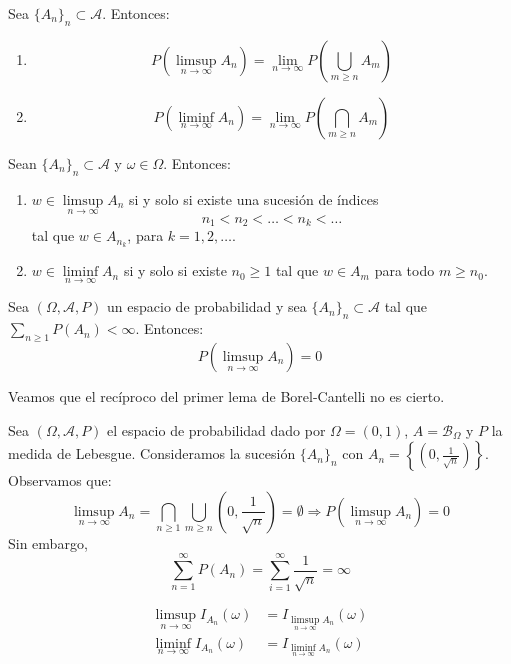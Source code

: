 \begin{theorem}
    Sea $\{A_n\}_n \subset \mathcal{A}$.
    Entonces:
    \begin{enumerate}
        \item $$P(\limsup\limits_{n \to \infty} A_n) = \lim\limits_{n \to \infty} P(\bigcup_{m \geq n} A_m)$$
        \item $$P(\liminf\limits_{n \to \infty} A_n) = \lim\limits_{n \to \infty} P(\bigcap_{m \geq n} A_m)$$
    \end{enumerate}
\end{theorem}

\begin{theorem}
    Sean $\{A_n\}_n \subset \mathcal{A}$ y $\omega \in \Omega$.
    Entonces:
    \begin{enumerate}
        \item $w \in \limsup\limits_{n \to \infty} A_n$ si y solo si existe una sucesión de índices
              $$n_1 < n_2 < \dots < n_k < \dots$$
              tal que $w \in A_{n_k}$, para $k = 1, 2, \dots$.
        \item $w \in \liminf\limits_{n \to \infty} A_n$ si y solo si existe $n_0 \geq 1$ tal que $w \in A_m$ para todo $m \geq n_0$.
    \end{enumerate}
\end{theorem}

\begin{theorem}
    Sea $(\Omega, \mathcal{A}, P)$ un espacio de probabilidad y sea $\{A_n\}_n \subset \mathcal{A}$ tal que $\sum_{n \geq 1} P(A_n) < \infty$.
    Entonces:
    $$P(\limsup\limits_{n \to \infty} A_n) = 0$$
\end{theorem}

Veamos que el recíproco del primer lema de Borel-Cantelli no es cierto.
\begin{example}
    Sea $(\Omega, \mathcal{A}, P)$ el espacio de probabilidad dado por $\Omega = (0, 1)$, $A = \mathcal{B}_\Omega$ y $P$ la medida de Lebesgue.
    Consideramos la sucesión $\{A_n\}_n$ con $A_n = \left\{\left(0, \frac{1}{\sqrt{n}}\right)\right\}$.
    Observamos que:
    $$\limsup\limits_{n \to \infty} A_n = \bigcap_{n \geq 1} \bigcup_{m \geq n} \left(0, \frac{1}{\sqrt{n}}\right) = \emptyset \Rightarrow P(\limsup\limits_{n \to \infty} A_n) = 0$$
    Sin embargo,
    $$\sum_{n=1}^\infty P(A_n) = \sum_{i=1}^\infty \frac{1}{\sqrt{n}} = \infty$$
\end{example}

\begin{remark}
    \begin{align*}
        \limsup\limits_{n \to \infty} I_{A_n}(\omega) & = I_{\limsup\limits_{n \to \infty} A_n}(\omega) \\
        \liminf\limits_{n \to \infty} I_{A_n}(\omega) & = I_{\liminf\limits_{n \to \infty} A_n}(\omega)
    \end{align*}
\end{remark}

